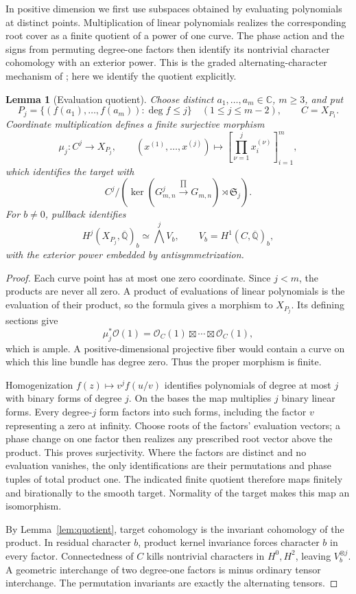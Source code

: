 \documentclass[11pt]{article}
\newcommand{\Q}{\mathbb Q}
\newcommand{\C}{\mathbb C}
\newcommand{\kk}{\overline{\Q}}
\theoremstyle{plain}
\newtheorem{lemma}[theorem]{Lemma}
\theoremstyle{definition}
\theoremstyle{remark}
\numberwithin{equation}{section}
\begin{document}
In positive dimension we first use subspaces obtained by evaluating
polynomials at distinct points.  Multiplication of linear polynomials
realizes the corresponding root cover as a finite quotient of a power
of one curve.  The phase action and the
signs from permuting degree-one factors then identify its nontrivial
character cohomology with an exterior power.  This is the graded
alternating-character mechanism of
\cite[Lemmas~1.1--1.2]{Schoen}; here we identify the quotient explicitly.

\begin{lemma}[Evaluation quotient]\label{lem:evaluation}
Choose distinct \(a_1,\ldots,a_m\in\C\), \(m\geq3\), and put
\[
 P_j=\{(f(a_1),\ldots,f(a_m)):\deg f\leq j\}
 \quad(1\leq j\leq m-2),\qquad C=X_{P_1}.
\]
Coordinate multiplication defines a finite surjective morphism
\[
 \mu_j:C^j\to X_{P_j},\qquad
 (x^{(1)},\ldots,x^{(j)})\mapsto
       [\prod_{\nu=1}^j x_i^{(\nu)}]_{i=1}^m,
\]
which identifies the target with
\[
 C^j\big/\left(\ker(G_{m,n}^j\xrightarrow{\prod}G_{m,n})
                  \rtimes\mathfrak S_j\right).
\]
For \(b\ne0\), pullback identifies
\[
 H^j(X_{P_j},\kk)_b\simeq\bigwedge^j V_b,\qquad
 V_b=H^1(C,\kk)_b,
\]
with the exterior power embedded by antisymmetrization.
\end{lemma}
\begin{proof}
Each curve point has at most one zero coordinate.  Since \(j<m\),
the products are never all zero.  A product of evaluations of
linear polynomials is the evaluation of their product, so the
formula gives a morphism to \(X_{P_j}\).  Its defining sections
give
\[
 \mu_j^*\mathcal O(1)
 =\mathcal O_C(1)\boxtimes\cdots\boxtimes\mathcal O_C(1),
\]
which is ample.  A positive-dimensional projective fiber would
contain a curve on which this line bundle has degree zero.  Thus
the proper morphism is finite.

Homogenization \(f(z)\mapsto v^j f(u/v)\) identifies polynomials of
degree at most \(j\) with binary forms of degree \(j\).
On the bases the map multiplies
\(j\) binary linear forms.  Every degree-\(j\) form factors into such
forms, including the factor \(v\) representing a zero at infinity.
Choose roots of the factors' evaluation vectors; a phase change
on one factor then realizes any prescribed root vector above the
product.  This proves surjectivity.  Where the factors are
distinct and no evaluation vanishes, the only identifications
are their permutations and phase tuples of total product one.
The indicated finite quotient therefore maps finitely and
birationally to the smooth target.  Normality of the target
makes this map an isomorphism.

By Lemma~\ref{lem:quotient}, target cohomology is the invariant
cohomology of the product.  In residual character \(b\), product
kernel invariance forces character \(b\) in every factor.
Connectedness of \(C\) kills nontrivial characters in \(H^0,H^2\),
leaving \(V_b^{\otimes j}\).  A geometric interchange of two
degree-one factors is minus ordinary tensor interchange.
The permutation invariants are exactly the alternating tensors.
\end{proof}
\end{document}

